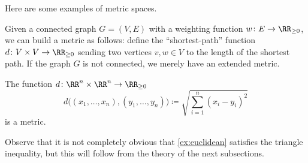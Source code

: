 \documentclass[../notes.tex]{subfiles}
\begin{document}
Here are some examples of metric spaces.
\begin{example}
	Given a connected graph $G=(V,E)$ with a weighting function $w\colon E\to\RR_{\ge0}$, we can build a metric as follows: define the ``shortest-path'' function $d\colon V\times V\to\RR_{\ge0}$ sending two vertices $v,w\in V$ to the length of the shortest path. If the graph $G$ is not connected, we merely have an extended metric.
\end{example}
\begin{example} \label{ex:euclidean}
	The function $d\colon\RR^n\times\RR^n\to\RR_{\ge0}$
	\[d\big((x_1,\ldots,x_n),(y_1,\ldots,y_n)\big)\coloneqq\sqrt{\sum_{i=1}^n(x_i-y_i)^2}\]
	is a metric.
\end{example}
Observe that it is not completely obvious that \autoref{ex:euclidean} satisfies the triangle inequality, but this will follow from the theory of the next subsections.
\end{document}
